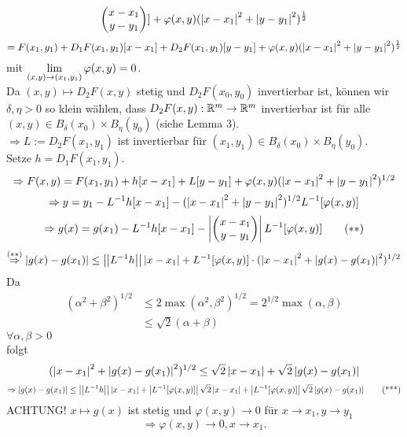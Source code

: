 \documentclass[../ana2.tex]{subfiles}
\begin{document}
\begin{bew}
\[\begin{pmatrix}
        x - x_1 \\ y - y_1
    \end{pmatrix}] 
    + \varphi(x,y) (\left| x - x_1 \right|^2 + \left|y - y_1\right|^2)^{\frac{1}{2}} \]
    \[ = F(x_1,y_1) + D_1 F(x_1, y_1)[x - x_1]
    + D_2 F(x_1, y_1)[y - y_1]
    + \varphi(x,y)(\left|x-x_1\right|^2 + \left|y - y_1\right|^2)^{\frac{1}{2}} \]
    mit \( \lim\limits_{(x,y)\rightarrow{}(x_1, y_1)} \varphi(x,y) = 0 \).\\
    Da \( (x,y) \mapsto D_2F(x,y) \) stetig und 
    \( D_2 F(x_0, y_0) \) invertierbar ist, können wir 
    \( \delta, \eta > 0 \) so klein wählen, dass 
    \( D_2 F(x,y) :\mathbb{R}^m\rightarrow \mathbb{R}^m \) invertierbar ist 
    für alle \( (x,y) \in B_\delta(x_0) \times B_\eta(y_0) \)
    (siehe Lemma 3).\\
    \(\Rightarrow L := D_2F(x_1,y_1)\) ist invertierbar für 
    \((x_1,y_1) \in B_\delta(x_0) \times B_\eta(y_0)\).\\
    Setze \( h = D_1F(x_1,y_1) \).\\
    \[ \Rightarrow F(x,y) = F(x_1, y_1) + h[x-x_1] + L[y - y_1] 
    + \varphi(x,y) (\left| x - x_1 \right|^2 + \left| y - y_1 \right|^2)^{1/2} \]
    \[ \Rightarrow y = y_1 - L^{-1}h[x - x_1] - 
    (\left| x - x_1 \right|^2 + \left|y - y_1\right|^2)^{1/2} L^{-1}[\varphi(x,y)] \]
    \[ \Rightarrow g(x) = g(x_1) - 
    L^{-1}h[x-x_1] - \left|\begin{pmatrix}
        x-x_1 \\ y - y_1
    \end{pmatrix}\right| L^{-1}[\varphi(x,y)] \tag{\(**\)} \]
    \[ \overset{(**)}{\Rightarrow} \left|g(x) - g(x_1)\right| 
    \leq \left|\left| L^{-1}h \right|\right|\left| x - x_1 \right| + L^{-1}[\varphi(x,y)] 
    \cdot ( \left|x - x_1\right|^2 + \left| g(x) - g(x_1) \right|^2)^{1/2} \]
    Da 
    \begin{align*}
        (\alpha^2+\beta^2)^{1/2} &\leq 2 \max (\alpha^2,\beta^2)^{1/2} = 2^{1/2} \max(\alpha, \beta) \\
        &\leq \sqrt{2} (\alpha+\beta)
    \end{align*}
    \(\forall \alpha, \beta > 0\)\\
    folgt 
    \[ ( \left|x - x_1\right|^2 + \left| g(x) - g(x_1) \right|^2 )^{1/2}
    \leq \sqrt{2} \left| x - x_1 \right| + \sqrt{2} \left| g(x) - g(x_1) \right| \]
    \[ \Rightarrow \left|g(x)-g(x_1)\right| \leq \left|\left|L^{-1}h\right|\right| \left|x-x_1\right|+\left|L^{-1}[\varphi(x,y)]\right| 
    \sqrt{2} \left|x-x_1\right| + \left|L^{-1}[\varphi(x,y)]\right|\sqrt{2} \left|g(x)-g(x_1)\right| \tag{***} \]
    ACHTUNG! \( x \mapsto g(x) \) ist stetig und \( \varphi(x,y) \rightarrow 0 \) 
    für \( x \rightarrow x_1, y \rightarrow y_1 \)
    \[ \Rightarrow \varphi(x,y) \rightarrow 0, x \rightarrow x_1. \]

\end{bew}
\end{document}

